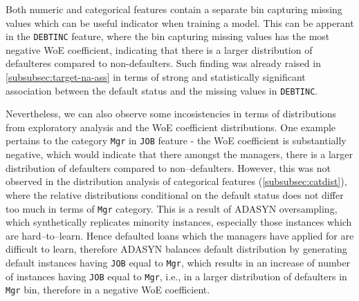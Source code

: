 Both numeric and categorical features contain a separate bin capturing missing values which can be useful indicator when training a model.
This can be apperant in the \texttt{DEBTINC} feature, where the bin capturing missing values has the most negative WoE coefficient, indicating that there is a larger distribution of defaulteres compared to non-defaulters.
Such finding was already raised in \autoref{subsubsec:target-na-ass} in terms of strong and statistically significant association between the default status and the missing values in \texttt{DEBTINC}.

Nevertheless, we can also observe some incosistencies in terms of distributions from exploratory analysis and the WoE coefficient distributions.
One example pertains to the category \texttt{Mgr} in \texttt{JOB} feature - the WoE coefficient is substantially negative, which would indicate that there amongst the managers, there is a larger distribution of defaulters compared to non--defaulters.
However, this was not observed in the distribution analysis of categorical features (\autoref{subsubsec:catdist}), where the relative distributions conditional on the default status does not differ too much in terms of \texttt{Mgr} category.
This is a result of ADASYN oversampling, which synthetically replicates minority instances, especially those instances which are hard--to--learn.
Hence defaulted loans which the managers have applied for are difficult to learn, therefore ADASYN balances default distribution by generating default instances having \texttt{JOB} equal to \texttt{Mgr}, which results in an increase of number of instances having \texttt{JOB} equal to \texttt{Mgr}, i.e., in a larger distribution of defaulters in \texttt{Mgr} bin, therefore in a negative WoE coefficient.


